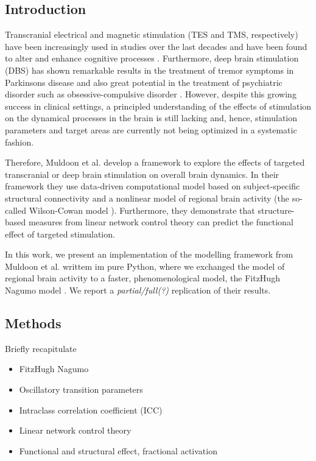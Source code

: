 \subsection{Introduction}


Transcranial electrical and magnetic stimulation  (TES and TMS, respectively) have been increasingly used in studies over the last decades and have been found to
alter and enhance cognitive processes
\supercite{Walsh2000,Lage2016,Paulus2016}. Furthermore, deep brain stimulation (DBS) has shown remarkable results in the treatment of tremor symptoms in 
Parkinsons disease \supercite{Collomb-Clerc2015} and also great potential 
in the treatment of psychiatric disorder such as obsessive-compulsive disorder \supercite{Alonso2015}.
However, despite this growing success in clinical settings, a principled understanding of the effects of stimulation on the dynamical processes in the brain 
is still lacking and, hence, stimulation parameters and target areas are currently not being optimized in a systematic fashion.    

Therefore, Muldoon et al. \supercite{Muldoon2016} develop a framework to explore the effects of targeted transcranial or deep brain stimulation on overall 
brain dynamics. In their framework they use data-driven computational model based on subject-specific structural connectivity and a nonlinear model of regional
brain activity (the so-called Wilson-Cowan model \supercite{Wilson1972}). Furthermore, they demonstrate that structure-based measures from linear network control theory 
can predict the functional effect of targeted stimulation.

In this work, we present an implementation of the modelling framework from Muldoon et al. \supercite{Muldoon2016} writtem im pure Python, where we exchanged
the model of regional brain activity to a faster, phenomenological model, the FitzHugh Nagumo model \supercite{FitzHugh1961}. We report a \textit{partial/full(?)} 
replication of their results.
\subsection{Methods}

Briefly recapitulate 
\begin{itemize}
 \item 
  FitzHugh Nagumo
 \item
  Oscillatory transition parameters
 \item
  Intraclass correlation coefficient (ICC)
 \item
  Linear network control theory
 \item
  Functional and structural effect, fractional activation
\end{itemize}

